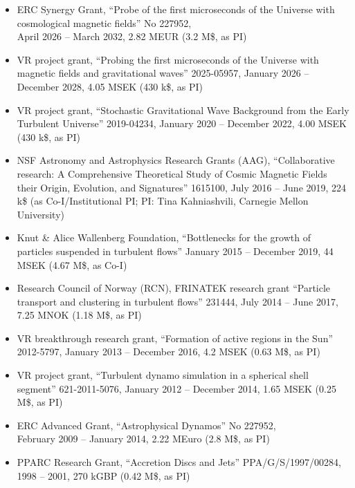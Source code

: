 \documentclass{article}
\begin{document}
\begin{itemize}

\item
ERC Synergy Grant, ``Probe of the first microseconds of the Universe with cosmological magnetic fields'' No 227952,\\
April 2026 -- March 2032, 2.82 MEUR
(3.2 M\$, as PI)

\item
VR project grant, ``Probing the first microseconds of the Universe with magnetic fields and gravitational waves''
2025-05957, January 2026 -- December 2028, 4.05 MSEK (430 k\$, as PI)

\item
VR project grant, ``Stochastic Gravitational Wave Background from the Early Turbulent Universe''
2019-04234, January 2020 -- December 2022, 4.00 MSEK (430 k\$, as PI)

\item
NSF Astronomy and Astrophysics Research Grants (AAG),
``Collaborative research: A Comprehensive Theoretical Study of Cosmic
Magnetic Fields their Origin, Evolution, and Signatures''
1615100, July 2016 -- June 2019, 224 k\$ (as Co-I/Institutional PI;
PI: Tina Kahniashvili, Carnegie Mellon University)

\item
Knut \& Alice Wallenberg Foundation,
``Bottlenecks for the growth of particles suspended in turbulent flows''
January 2015 -- December 2019, 44 MSEK (4.67 M\$, as Co-I)

\item
Research Council of Norway (RCN), FRINATEK research grant
``Particle transport and clustering in turbulent flows''
231444, July 2014 -- June 2017, 7.25 MNOK
(1.18 M\$, as PI)

\item
VR breakthrough research grant, ``Formation of active regions in the Sun''
2012-5797, January 2013 -- December 2016, 4.2 MSEK
(0.63 M\$, as PI)

\item
VR project grant, ``Turbulent dynamo simulation in a spherical shell segment''
621-2011-5076, January 2012 -- December 2014, 1.65 MSEK
(0.25 M\$, as PI)

\item
ERC Advanced Grant, ``Astrophysical Dynamos'' No 227952,\\
February 2009 -- January 2014, 2.22 MEuro
(2.8 M\$, as PI)

\item
PPARC Research Grant, ``Accretion Discs and Jets'' PPA/G/S/1997/00284,\\
1998 -- 2001, 270 kGBP
(0.42 M\$, as PI)

\end{itemize}
\end{document}
